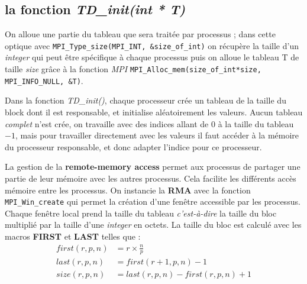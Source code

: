 \subsection*{la fonction \textit{TD\_init(int * T)}}

On alloue une partie du tableau que sera traitée par processus ; dans cette optique avec \verb+MPI_Type_size(MPI_INT, &size_of_int)+ on récupère la taille d'un \textit{integer} qui peut être spécifique à chaque processus puis on alloue le tableau T de taille \textit{size} grâce à la fonction \textit{MPI} \verb+MPI_Alloc_mem(size_of_int*size, MPI_INFO_NULL, &T)+. 





Dans la fonction \textit{TD\_init()}, chaque processeur crée un tableau de la taille du block dont il est responsable, et initialise aléatoirement les valeurs. Aucun tableau \emph{complet} n'est crée, on travaille avec des indices allant de $0$ à la taille du tableau $-1$, mais pour travailler directement avec les valeurs il faut accéder à la mémoire du processeur responsable, et donc adapter l'indice pour ce processeur.

La gestion de la \textbf{remote-memory access} permet aux processus de partager une partie de leur mémoire avec les autres processus. Cela facilite les différents accès mémoire entre les processus. On instancie la \textbf{RMA} avec la fonction \verb+MPI_Win_create+ qui permet la création d'une fenêtre accessible par les processus. Chaque fenêtre local prend la taille du tableau \textit{c'est-à-dire} la taille du bloc multiplié par la taille d'une \textit{integer} en octets. La taille du bloc est calculé avec les macros \textbf{FIRST} et \textbf{LAST} telles que :
\begin{align*}
first(r,p,n) &= r \times \frac{n}{p}\\
last(r,p,n) &= first(r+1,p,n) - 1\\
size(r,p,n) &= last(r,p,n) - first(r,p,n) + 1
\end{align*}